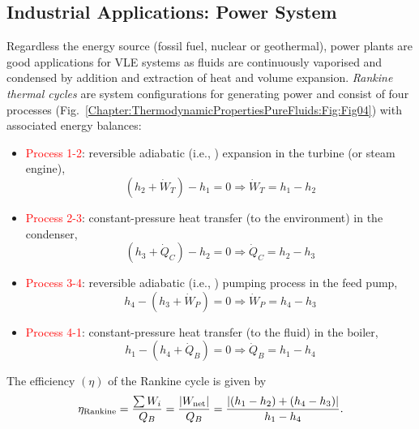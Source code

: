    \subsection{Industrial Applications: Power System}\label{Chapter:ThermodynamicPropertiesPureFluids:Section:PowerSystem}
Regardless the energy source (fossil fuel, nuclear or geothermal), power plants are good applications for VLE systems as fluids are continuously vaporised and condensed by addition and extraction of heat and volume expansion. {\it Rankine thermal cycles} are system configurations for generating power and consist of four processes (Fig.~\ref{Chapter:ThermodynamicPropertiesPureFluids:Fig:Fig04}) with associated energy balances:
     \begin{itemize}
      \item \textcolor{red}{Process 1-2}: reversible adiabatic (i.e., ) expansion in the turbine (or steam engine),
            \begin{displaymath}
               \left(h_{2} + \dot{W}_{T}\right)-h_{1} = 0 \Rightarrow \dot{W}_{T} = h_{1}-h_{2}
            \end{displaymath}
      \item \textcolor{red}{Process 2-3}: constant-pressure heat transfer (to the environment) in the condenser,
            \begin{displaymath}
               \left(h_{3} + \dot{Q}_{C}\right)-h_{2} = 0 \Rightarrow \dot{Q}_{C} = h_{2}-h_{3}
            \end{displaymath}
      \item \textcolor{red}{Process 3-4}: reversible adiabatic (i.e., ) pumping process in the feed pump,
            \begin{displaymath}
               h_{4} - \left(h_{3} + \dot{W}_{P}\right) = 0 \Rightarrow \dot{W}_{P} = h_{4}-h_{3}
            \end{displaymath}
      \item \textcolor{red}{Process 4-1}: constant-pressure heat transfer (to the fluid) in the boiler,
            \begin{displaymath}
               h_{1} - \left(h_{4} + \dot{Q}_{B}\right) = 0 \Rightarrow \dot{Q}_{B} = h_{1}-h_{4}
            \end{displaymath} 
     \end{itemize}
     The efficiency $\left(\eta\right)$ of the Rankine cycle is given by
           \begin{displaymath}
               \eta_{\text{Rankine}} = \displaystyle\frac{\sum W_{i}}{Q_{B}} = \displaystyle\frac{\left|W_{\text{net}}\right|}{Q_{B}} = \displaystyle\frac{\left|\left(h_{1}-h_{2}\right)+\left(h_{4}-h_{3}\right)\right|}{h_{1}-h_{4}}.
           \end{displaymath}

